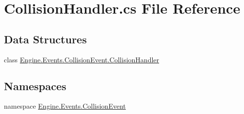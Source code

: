 \hypertarget{a00047}{}\section{Collision\+Handler.\+cs File Reference}
\label{a00047}
\subsection*{Data Structures}
\begin{DoxyCompactItemize}
\item 
class \hyperlink{a00354}{Engine.\+Events.\+Collision\+Event.\+Collision\+Handler}
\end{DoxyCompactItemize}
\subsection*{Namespaces}
\begin{DoxyCompactItemize}
\item 
namespace \hyperlink{a00245}{Engine.\+Events.\+Collision\+Event}
\end{DoxyCompactItemize}
